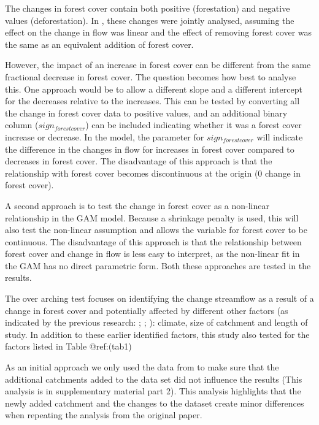 \documentclass[]{elsarticle} %
\begin{document}
The changes in forest cover contain both positive (forestation) and negative values (deforestation). In \citet{zhang2017}, these changes were jointly analysed, assuming the effect on the change in flow was linear and the effect of removing forest cover was the same as an equivalent addition of forest cover.

However, the impact of an increase in forest cover can be different from the same fractional decrease in forest cover. The question becomes how best to analyse this. One approach would be to allow a different slope and a different intercept for the decreases relative to the increases.
This can be tested by converting all the change in forest cover data to positive values, and an additional binary column (\(sign_{forest cover}\)) can be included indicating whether it was a forest cover increase or decrease. In the model, the parameter for \(sign_{forest cover}\) will indicate the difference in the changes in flow for increases in forest cover compared to decreases in forest cover. The disadvantage of this approach is that the relationship with forest cover becomes discontinuous at the origin (0 change in forest cover).

A second approach is to test the change in forest cover as a non-linear relationship in the GAM model. Because a shrinkage penalty is used, this will also test the non-linear assumption and allows the variable for forest cover to be continuous. The disadvantage of this approach is that the relationship between forest cover and change in flow is less easy to interpret, as the non-linear fit in the GAM has no direct parametric form.
Both these approaches are tested in the results.

The over arching test focuses on identifying the change streamflow as a result of a change in forest cover and potentially affected by different other factors (as indicated by the previous research: \citet{zhang2017}; \citet{filoso2017}; \citet{zhou2015}): climate, size of catchment and length of study. In addition to these earlier identified factors, this study also tested for the factors listed in Table @ref:(tab1)

As an initial approach we only used the data from \citet{zhang2017} to make sure that the additional catchments added to the data set did not influence the results (This analysis is in supplementary material part 2). This analysis highlights that the newly added catchment and the changes to the dataset create minor differences when repeating the analysis from the original paper.
\end{document}
